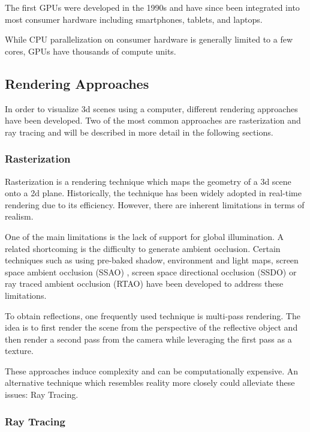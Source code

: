 The first GPUs were developed in the 1990s and have since been integrated into most consumer hardware including smartphones, tablets, and laptops.

While CPU parallelization on consumer hardware is generally limited to a few cores, GPUs have thousands of compute units.

\subsection{Rendering Approaches}

In order to visualize 3d scenes using a computer, different rendering approaches have been developed. Two of the most common approaches are rasterization and ray tracing and will be described in more detail in the following sections.

\subsubsection{Rasterization}

Rasterization is a rendering technique which maps the geometry of a 3d scene onto a 2d plane. Historically, the technique has been widely adopted in real-time rendering due to its efficiency. However, there are inherent limitations in terms of realism.

One of the main limitations is the lack of support for global illumination. A related shortcoming is the difficulty to generate ambient occlusion. Certain techniques such as using pre-baked shadow, environment and light maps, screen space ambient occlusion (SSAO) \cite{bavoil2008ssao}, screen space directional occlusion (SSDO) \cite{ritschel2009ssdo} or ray traced ambient occlusion (RTAO) \cite{gautron2020rtao} have been developed to address these limitations.

To obtain reflections, one frequently used technique is multi-pass rendering. The idea is to first render the scene from the perspective of the reflective object and then render a second pass from the camera while leveraging the first pass as a texture.

These approaches induce complexity and can be computationally expensive. An alternative technique which resembles reality more closely could alleviate these issues: Ray Tracing.

\subsubsection{Ray Tracing}

